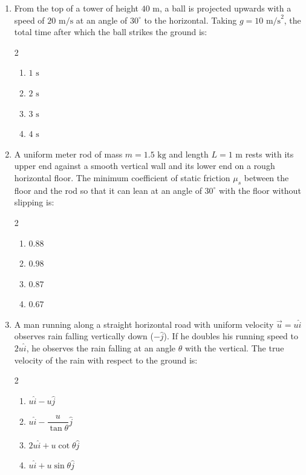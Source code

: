 \documentclass[11pt,a4paper]{article}
\begin{document}
\begin{enumerate}[label=\textbf{\textcolor{l3Crimson}{Q\arabic*.}},leftmargin=24pt,itemsep=10pt,start=51]
  \item From the top of a tower of height $40\text{ m}$, a ball is projected upwards with a speed of $20\text{ m/s}$ at an angle of $30^\circ$ to the horizontal. Taking $g = 10\text{ m/s}^2$, the total time after which the ball strikes the ground is:
  \begin{multicols}{2}
  \begin{enumerate}[label=\textbf{\textcolor{primaryDark}{(\Alph*)}},itemsep=2pt]
    \item $1\text{ s}$
    \item $2\text{ s}$
    \item $3\text{ s}$
    \item $4\text{ s}$
  \end{enumerate}
  \end{multicols}

  \item A uniform meter rod of mass $m = 1.5\text{ kg}$ and length $L = 1\text{ m}$ rests with its upper end against a smooth vertical wall and its lower end on a rough horizontal floor. The minimum coefficient of static friction $\mu_s$ between the floor and the rod so that it can lean at an angle of $30^\circ$ with the floor without slipping is:
  \begin{multicols}{2}
  \begin{enumerate}[label=\textbf{\textcolor{primaryDark}{(\Alph*)}},itemsep=2pt]
    \item $0.88$
    \item $0.98$
    \item $0.87$
    \item $0.67$
  \end{enumerate}
  \end{multicols}

  \item A man running along a straight horizontal road with uniform velocity $\vec{u} = u\hat{i}$ observes rain falling vertically down ($-\hat{j}$). If he doubles his running speed to $2u\hat{i}$, he observes the rain falling at an angle $\theta$ with the vertical. The true velocity of the rain with respect to the ground is:
  \begin{multicols}{2}
  \begin{enumerate}[label=\textbf{\textcolor{primaryDark}{(\Alph*)}},itemsep=2pt]
    \item $u\hat{i} - u\hat{j}$
    \item $u\hat{i} - \dfrac{u}{\tan\theta}\hat{j}$
    \item $2u\hat{i} + u\cot\theta\hat{j}$
    \item $u\hat{i} + u\sin\theta\hat{j}$
  \end{enumerate}
  \end{multicols}


\end{enumerate}
\end{document}
